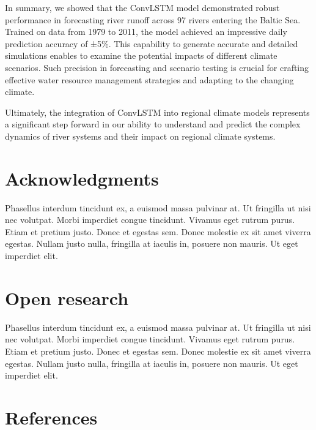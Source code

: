 \documentclass[
]{agujournal2019}
\begin{document}
In summary, we showed that the ConvLSTM model demonstrated robust
performance in forecasting river runoff across 97 rivers entering the
Baltic Sea. Trained on data from 1979 to 2011, the model achieved an
impressive daily prediction accuracy of ±5\%. This capability to
generate accurate and detailed simulations enables to examine the
potential impacts of different climate scenarios. Such precision in
forecasting and scenario testing is crucial for crafting effective water
resource management strategies and adapting to the changing climate.

Ultimately, the integration of ConvLSTM into regional climate models
represents a significant step forward in our ability to understand and
predict the complex dynamics of river systems and their impact on
regional climate systems.

\section{Acknowledgments}\label{acknowledgments}

Phasellus interdum tincidunt ex, a euismod massa pulvinar at. Ut
fringilla ut nisi nec volutpat. Morbi imperdiet congue tincidunt.
Vivamus eget rutrum purus. Etiam et pretium justo. Donec et egestas sem.
Donec molestie ex sit amet viverra egestas. Nullam justo nulla,
fringilla at iaculis in, posuere non mauris. Ut eget imperdiet elit.

\section{Open research}\label{open-research}

Phasellus interdum tincidunt ex, a euismod massa pulvinar at. Ut
fringilla ut nisi nec volutpat. Morbi imperdiet congue tincidunt.
Vivamus eget rutrum purus. Etiam et pretium justo. Donec et egestas sem.
Donec molestie ex sit amet viverra egestas. Nullam justo nulla,
fringilla at iaculis in, posuere non mauris. Ut eget imperdiet elit.

\section*{References}\label{references}
\end{document}

